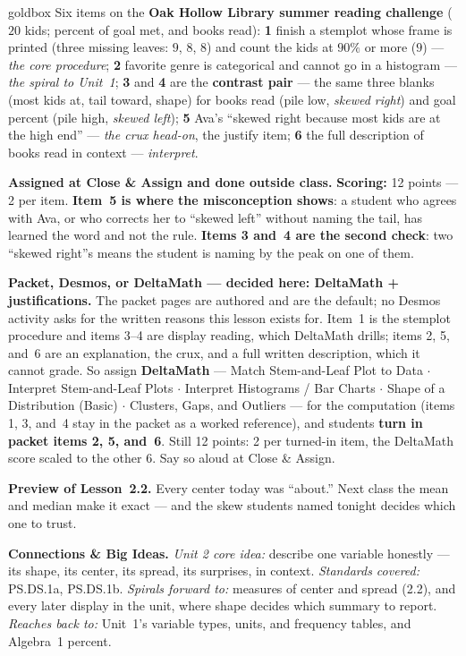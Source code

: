 \documentclass[10pt]{article}
\begin{document}
\boxguard
\begin{skillbox}{goldbox}
Six items on the \textbf{Oak Hollow Library summer reading challenge} ($20$ kids; percent of
goal met, and books read): \textbf{1} finish a stemplot whose frame is printed (three missing
leaves: $9$, $8$, $8$) and count the kids at $90\%$ or more ($9$) --- \emph{the core procedure};
\textbf{2} favorite genre is categorical and cannot go in a histogram --- \emph{the spiral to
Unit~1}; \textbf{3} and \textbf{4} are the \textbf{contrast pair} --- the same three blanks
(most kids at, tail toward, shape) for books read (pile low, \emph{skewed right}) and goal
percent (pile high, \emph{skewed left}); \textbf{5} Ava's ``skewed right because most kids are
at the high end'' --- \emph{the crux head-on}, the justify item; \textbf{6} the full description
of books read in context --- \emph{interpret}.

\textbf{Assigned at Close \& Assign and done outside class.} \textbf{Scoring:} 12 points --- 2 per
item. \textbf{Item~5 is where the misconception shows}: a student who agrees with Ava, or who
corrects her to ``skewed left'' without naming the tail, has learned the word and not the rule.
\textbf{Items 3 and~4 are the second check}: two ``skewed right''s means the student is naming
by the peak on one of them.

\textbf{Packet, Desmos, or DeltaMath --- decided here: DeltaMath + justifications.} The packet
pages are authored and are the default; no Desmos activity asks for the written reasons this
lesson exists for. Item~1 is the stemplot procedure and items 3--4 are display reading, which
DeltaMath drills; items 2, 5, and~6 are an explanation, the crux, and a full written description,
which it cannot grade. So assign \textbf{DeltaMath} --- Match Stem-and-Leaf Plot to Data $\cdot$ Interpret
Stem-and-Leaf Plots $\cdot$ Interpret Histograms / Bar Charts $\cdot$ Shape of a Distribution
(Basic) $\cdot$ Clusters, Gaps, and Outliers --- for the computation
(items 1, 3, and~4 stay in the packet as a worked reference), and students \textbf{turn in packet
items 2, 5, and~6}. Still 12 points: 2 per turned-in item, the DeltaMath score scaled to the other
6. Say so aloud at Close \& Assign.

\textbf{Preview of Lesson~2.2.} Every center today was ``about.'' Next class the mean and
median make it exact --- and the skew students named tonight decides which one to trust.

\textbf{Connections \& Big Ideas.} \textit{Unit 2 core idea:} describe one variable honestly ---
its shape, its center, its spread, its surprises, in context. \textit{Standards covered:}
PS.DS.1a, PS.DS.1b. \textit{Spirals forward to:} measures of center and spread (2.2), and every
later display in the unit, where shape decides which summary to report. \textit{Reaches back
to:} Unit~1's variable types, units, and frequency tables, and Algebra~1 percent.
\end{skillbox}
\end{document}
